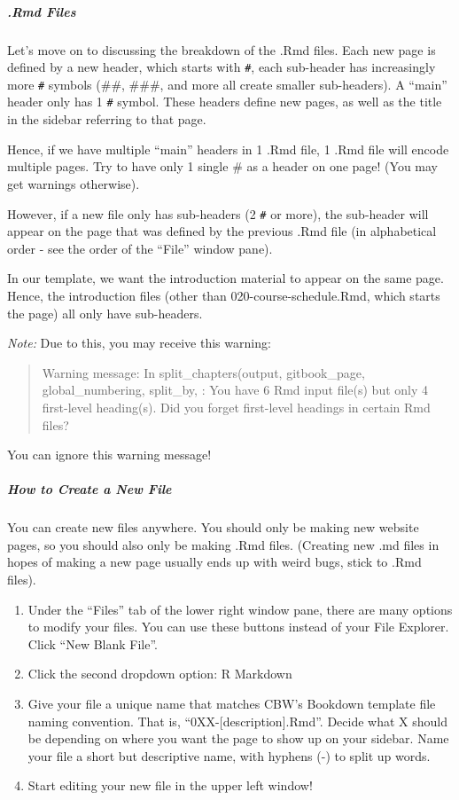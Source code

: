 \documentclass[
]{book}
\providecommand{\tightlist}{%
  \setlength{\itemsep}{0pt}\setlength{\parskip}{0pt}}
\theoremstyle{definition}
\theoremstyle{definition}
\theoremstyle{definition}
\theoremstyle{definition}
\theoremstyle{remark}
\begin{document}
\subparagraph*{\texorpdfstring{ .Rmd Files }{ .Rmd Files }}\label{rmd-files}

Let's move on to discussing the breakdown of the .Rmd files. Each new page is defined by a new header, which starts with \texttt{\#}, each sub-header has increasingly more \texttt{\#} symbols (\#\#, \#\#\#, and more all create smaller sub-headers). A ``main'' header only has 1 \texttt{\#} symbol. These headers define new pages, as well as the title in the sidebar referring to that page.

Hence, if we have multiple ``main'' headers in 1 .Rmd file, 1 .Rmd file will encode multiple pages. Try to have only 1 single \# as a header on one page! (You may get warnings otherwise).

However, if a new file only has sub-headers (2 \texttt{\#} or more), the sub-header will appear on the page that was defined by the previous .Rmd file (in alphabetical order - see the order of the ``File'' window pane).

In our template, we want the introduction material to appear on the same page. Hence, the introduction files (other than 020-course-schedule.Rmd, which starts the page) all only have sub-headers.

\emph{Note:} Due to this, you may receive this warning:

\begin{quote}
Warning message:
In split\_chapters(output, gitbook\_page, global\_numbering, split\_by, :
You have 6 Rmd input file(s) but only 4 first-level heading(s). Did you forget first-level headings in certain Rmd files?
\end{quote}

You can ignore this warning message!

\subparagraph*{\texorpdfstring{ How to Create a New File }{ How to Create a New File }}\label{how-to-create-a-new-file}

You can create new files anywhere. You should only be making new website pages, so you should also only be making .Rmd files. (Creating new .md files in hopes of making a new page usually ends up with weird bugs, stick to .Rmd files).

\begin{enumerate}
\def\labelenumi{\arabic{enumi}.}
\tightlist
\item
  Under the ``Files'' tab of the lower right window pane, there are many options to modify your files. You can use these buttons instead of your File Explorer. Click ``New Blank File''.
\item
  Click the second dropdown option: R Markdown
\item
  Give your file a unique name that matches CBW's Bookdown template file naming convention. That is, ``0XX-{[}description{]}.Rmd''. Decide what X should be depending on where you want the page to show up on your sidebar. Name your file a short but descriptive name, with hyphens (-) to split up words.
\item
  Start editing your new file in the upper left window!
\end{enumerate}
\end{document}

